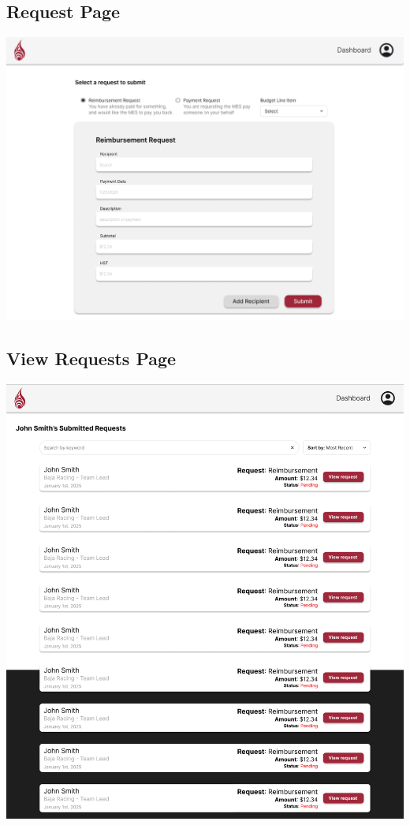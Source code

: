 \documentclass[12pt, titlepage]{article}
\begin{document}
\subsection{Request Page}
\includegraphics[]{imgs/RequestPage.png}

\subsection{View Requests Page}
\includegraphics[]{imgs/ViewRequestsPage.png}
\end{document}

